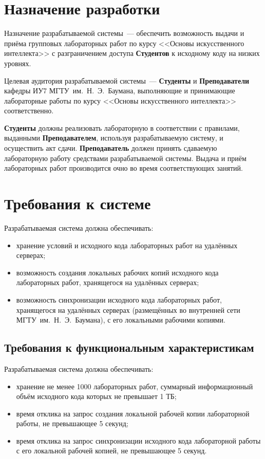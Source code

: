 \documentclass{bmstu}
\begin{document}
  \section{Назначение разработки}

  Назначение разрабатываемой системы~--- обеспечить возможность выдачи и приёма
  групповых лабораторных работ по курсу <<Основы искусственного интеллекта>> с
  разграничением доступа \textbf{Студентов} к исходному коду на низких уровнях.

  Целевая аудитория разрабатываемой системы~--- \textbf{Студенты} и
  \textbf{Преподаватели} кафедры ИУ7 МГТУ~им.~Н.~Э.~Баумана, выполняющие и
  принимающие лабораторные работы по курсу <<Основы искусственного интеллекта>>
  соответственно.

  \textbf{Студенты} должны реализовать лабораторную в соответствии с правилами,
  выданными \textbf{Преподавателем}, используя разрабатываемую систему, и
  осуществить акт сдачи.
  \textbf{Преподаватель} должен принять сдаваемую лабораторную работу
  средствами разрабатываемой системы.
  Выдача и приём лабораторных работ производится очно во время соответствующих занятий.

  \section{Требования к системе}

  Разрабатываемая система должна обеспечивать:
  \begin{itemize}[label=---]
    \item хранение условий и исходного кода лабораторных работ на
      удалённых серверах;
    \item возможность создания локальных рабочих копий исходного кода
      лабораторных работ, хранящегося на удалённых серверах;
    \item возможность синхронизации исходного кода лабораторных работ,
      хранящегося на удалённых серверах (размещённых во внутренней сети
      МГТУ~им.~Н.~Э.~Баумана), с его локальными рабочими копиями.
  \end{itemize}

  \subsection{Требования к функциональным характеристикам}

  Разрабатываемая система должна обеспечивать:
  \begin{itemize}[label=---]
    \item хранение не менее 1000 лабораторных работ, суммарный
      информационный объём исходного кода которых не превышает 1 ТБ;
    \item время отклика на запрос создания локальной рабочей копии лабораторной работы,
      не превышающее 5 секунд;
    \item время отклика на запрос синхронизации исходного кода лабораторной работы с его локальной
      рабочей копией, не превышающее 5 секунд.
  \end{itemize}
\end{document}
